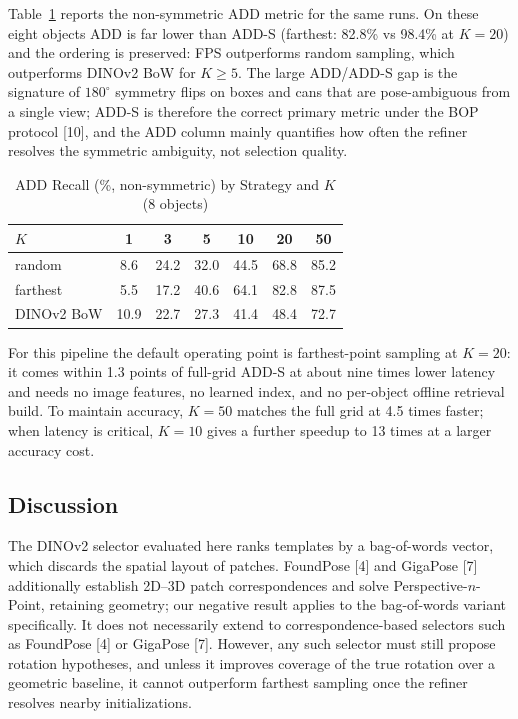 \documentclass[10pt,twocolumn,letterpaper]{article}
\begin{document}
Table~\ref{tab:add} reports the non-symmetric ADD metric for the same runs. On these eight objects ADD is far lower than ADD-S (farthest: 82.8\% vs 98.4\% at $K{=}20$) and the ordering is preserved: FPS outperforms random sampling, which outperforms DINOv2 BoW for $K \ge 5$. The large ADD/ADD-S gap is the signature of $180^{\circ}$ symmetry flips on boxes and cans that are pose-ambiguous from a single view; ADD-S is therefore the correct primary metric under the BOP protocol [10], and the ADD column mainly quantifies how often the refiner resolves the symmetric ambiguity, not selection quality.

\begin{table}[tb]
\caption{ADD Recall (\%, non-symmetric) by Strategy and $K$ (8 objects)}
\label{tab:add}
\centering\small
\begin{tabular}{@{}lcccccc@{}}
\toprule
$K$ & 1 & 3 & 5 & 10 & 20 & 50 \\
\midrule
random & 8.6 & 24.2 & 32.0 & 44.5 & 68.8 & 85.2 \\
farthest & 5.5 & 17.2 & 40.6 & 64.1 & 82.8 & 87.5 \\
DINOv2 BoW & 10.9 & 22.7 & 27.3 & 41.4 & 48.4 & 72.7 \\
\bottomrule
\end{tabular}
\end{table}

For this pipeline the default operating point is farthest-point sampling at $K{=}20$: it comes within 1.3 points of full-grid ADD-S at about nine times lower latency and needs no image features, no learned index, and no per-object offline retrieval build. To maintain accuracy, $K{=}50$ matches the full grid at 4.5 times faster; when latency is critical, $K{=}10$ gives a further speedup to 13 times at a larger accuracy cost.

\subsection{Discussion}
The DINOv2 selector evaluated here ranks templates by a bag-of-words vector, which discards the spatial layout of patches. FoundPose [4] and GigaPose [7] additionally establish 2D--3D patch correspondences and solve Perspective-$n$-Point, retaining geometry; our negative result applies to the bag-of-words variant specifically. It does not necessarily extend to correspondence-based selectors such as FoundPose [4] or GigaPose [7]. However, any such selector must still propose rotation hypotheses, and unless it improves coverage of the true rotation over a geometric baseline, it cannot outperform farthest sampling once the refiner resolves nearby initializations.
\end{document}
